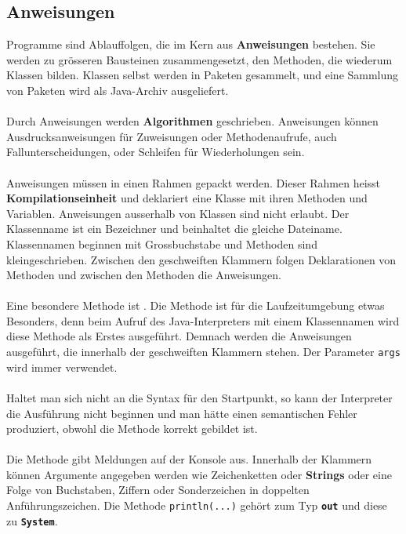 \subsection{Anweisungen}
Programme sind Ablauffolgen, die im Kern aus \textbf{Anweisungen} bestehen. Sie werden zu grösseren Bausteinen zusammengesetzt, den Methoden, die wiederum Klassen bilden. Klassen selbst werden in Paketen gesammelt, und eine Sammlung von Paketen wird als Java-Archiv ausgeliefert.
\\\\
Durch Anweisungen werden \textbf{Algorithmen} geschrieben. Anweisungen können Ausdrucksanweisungen für Zuweisungen oder Methodenaufrufe, auch  Fallunterscheidungen, oder Schleifen für Wiederholungen sein.
\\\\
Anweisungen müssen in einen Rahmen gepackt werden. Dieser Rahmen heisst \textbf{Kompilationseinheit} und deklariert eine Klasse mit ihren Methoden und Variablen. Anweisungen ausserhalb von Klassen sind nicht erlaubt. Der Klassenname ist ein Bezeichner und beinhaltet die gleiche Dateiname. Klassennamen beginnen mit Grossbuchstabe und Methoden sind kleingeschrieben. Zwischen den geschweiften Klammern folgen Deklarationen von Methoden und zwischen den Methoden die Anweisungen.
\\\\
Eine besondere Methode ist . Die Methode ist für die Laufzeitumgebung etwas Besonders, denn beim Aufruf des Java-Interpreters mit einem Klassennamen wird diese Methode als Erstes ausgeführt. Demnach werden die Anweisungen ausgeführt, die innerhalb der geschweiften Klammern stehen. Der Parameter \texttt{args} wird immer verwendet.
\\\\
Haltet man sich nicht an die Syntax für den Startpunkt, so kann der Interpreter die Ausführung nicht beginnen und man hätte einen semantischen Fehler produziert, obwohl die Methode korrekt gebildet ist.
\\\\
Die Methode  gibt Meldungen auf der Konsole aus. Innerhalb der Klammern können Argumente angegeben werden wie Zeichenketten oder \textbf{Strings} oder eine Folge von Buchstaben, Ziffern oder Sonderzeichen in doppelten Anführungszeichen. Die Methode \texttt{println(...)} gehört zum Typ \textbf{\texttt{out}} und diese zu \textbf{\texttt{System}}.

